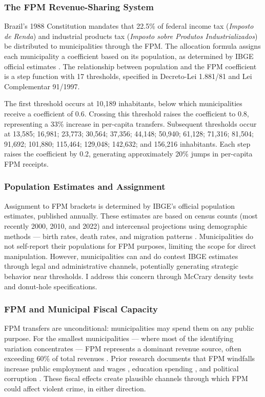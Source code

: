 \documentclass[12pt]{article}
\begin{document}
\subsubsection*{The FPM Revenue-Sharing System} Brazil's 1988 Constitution mandates that 22.5\% of federal income tax (\textit{Imposto de Renda}) and industrial products tax (\textit{Imposto sobre Produtos Industrializados}) be distributed to municipalities through the FPM. The allocation formula assigns each municipality a coefficient based on its population, as determined by IBGE official estimates \citep{corbi2019fiscal}. The relationship between population and the FPM coefficient is a step function with 17 thresholds, specified in Decreto-Lei 1.881/81 and Lei Complementar 91/1997.

The first threshold occurs at 10,189 inhabitants, below which municipalities receive a coefficient of 0.6. Crossing this threshold raises the coefficient to 0.8, representing a 33\% increase in per-capita transfers. Subsequent thresholds occur at 13,585; 16,981; 23,773; 30,564; 37,356; 44,148; 50,940; 61,128; 71,316; 81,504; 91,692; 101,880; 115,464; 129,048; 142,632; and 156,216 inhabitants. Each step raises the coefficient by 0.2, generating approximately 20\% jumps in per-capita FPM receipts.

\subsubsection*{Population Estimates and Assignment} Assignment to FPM brackets is determined by IBGE's official population estimates, published annually. These estimates are based on census counts (most recently 2000, 2010, and 2022) and intercensal projections using demographic methods --- birth rates, death rates, and migration patterns \citep{litschig2012internal}. Municipalities do not self-report their populations for FPM purposes, limiting the scope for direct manipulation. However, municipalities can and do contest IBGE estimates through legal and administrative channels, potentially generating strategic behavior near thresholds. I address this concern through McCrary density tests and donut-hole specifications.

\subsubsection*{FPM and Municipal Fiscal Capacity} FPM transfers are unconditional: municipalities may spend them on any public purpose. For the smallest municipalities --- where most of the identifying variation concentrates --- FPM represents a dominant revenue source, often exceeding 60\% of total revenues \citep{corbi2019fiscal}. Prior research documents that FPM windfalls increase public employment and wages \citep{corbi2019fiscal}, education spending \citep{litschig2013impact}, and political corruption \citep{brollo2013political}. These fiscal effects create plausible channels through which FPM could affect violent crime, in either direction.
\end{document}

